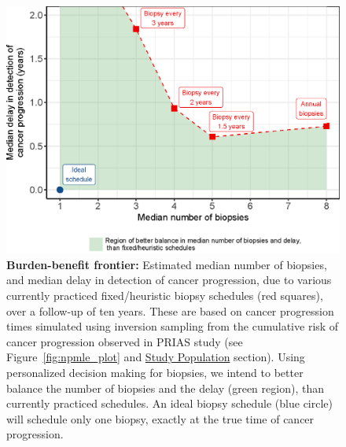 \begin{figure}[!htb]
\captionsetup{justification=justified}
\centerline{\includegraphics[width=\columnwidth]{images/better_balance_intro.eps}}
\caption{\textbf{Burden-benefit frontier:} Estimated median number of biopsies, and median delay in detection of cancer progression, due to various currently practiced fixed/heuristic biopsy schedules (red squares), over a follow-up of ten years. These are based on cancer progression times simulated using inversion sampling from the cumulative risk of cancer progression observed in PRIAS study (see Figure~\ref{fig:npmle_plot} and \hyperref[subsec:study_population]{Study Population} section). Using personalized decision making for biopsies, we intend to better balance the number of biopsies and the delay (green region), than currently practiced schedules. An ideal biopsy schedule (blue circle) will schedule only one biopsy, exactly at the true time of cancer progression.}
\label{fig:better_balance_intro}
\end{figure}

